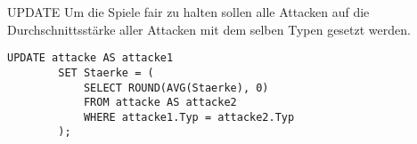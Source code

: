 \begin{example}{UPDATE}
    Um die Spiele fair zu halten sollen alle Attacken auf die Durchschnittsstärke aller Attacken mit dem selben Typen gesetzt werden.

    \exampleseparator

    \begin{lstlisting}[language=mysql]
        UPDATE attacke AS attacke1
        SET Staerke = (
            SELECT ROUND(AVG(Staerke), 0)
            FROM attacke AS attacke2
            WHERE attacke1.Typ = attacke2.Typ 
        );
    \end{lstlisting}
\end{example}